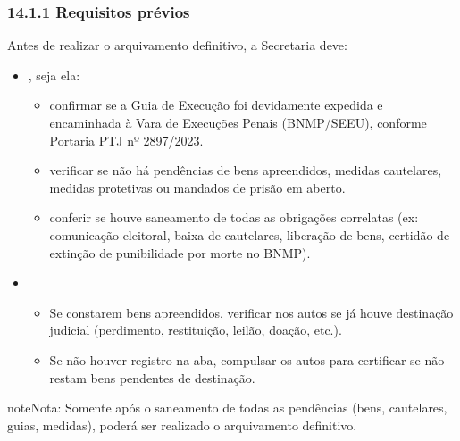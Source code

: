 \documentclass[letterpaper,10pt,brazil]{sphinxmanual}
\begin{document}
\subsubsection{14.1.1 \textendash{} Requisitos prévios}
\label{\detokenize{13baixa definitiva:requisitos-previos}}
\sphinxAtStartPar
Antes de realizar o arquivamento definitivo, a Secretaria deve:
\begin{itemize}
\item {} 
\sphinxAtStartPar
{}, seja ela:
\begin{itemize}
\item {} 
\sphinxAtStartPar
{} confirmar se a Guia de Execução foi devidamente expedida e encaminhada à Vara de Execuções Penais (BNMP/SEEU), conforme Portaria PTJ nº 2897/2023.

\item {} 
\sphinxAtStartPar
{} verificar se não há pendências de bens apreendidos, medidas cautelares, medidas protetivas ou mandados de prisão em aberto.

\item {} 
\sphinxAtStartPar
{} conferir se houve saneamento de todas as obrigações correlatas (ex: comunicação eleitoral, baixa de cautelares, liberação de bens, certidão de extinção de punibilidade por morte no BNMP).

\end{itemize}

\item {} 
\sphinxAtStartPar
{}
\begin{itemize}
\item {} 
\sphinxAtStartPar
Se constarem bens apreendidos, verificar nos autos se já houve destinação judicial (perdimento, restituição, leilão, doação, etc.).

\item {} 
\sphinxAtStartPar
Se não houver registro na aba, compulsar os autos para certificar se não restam bens pendentes de destinação.

\end{itemize}

\end{itemize}

\begin{sphinxadmonition}{note}{Nota:}
\sphinxAtStartPar
Somente após o saneamento de todas as pendências (bens, cautelares, guias, medidas), poderá ser realizado o arquivamento definitivo.
\end{sphinxadmonition}
\end{document}

